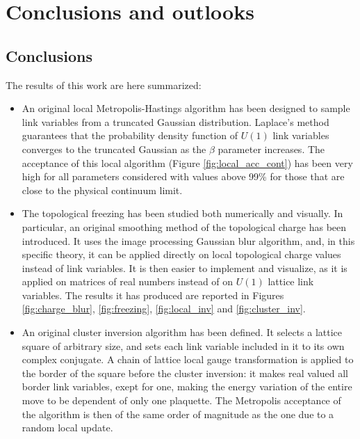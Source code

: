 \chapter{Conclusions and outlooks}\label{ch:conclusion}
\section{Conclusions}
The results of this work are here summarized:
\begin{itemize}
    \item
        An original local Metropolis-Hastings algorithm has been designed to sample link variables from a truncated Gaussian distribution.
        Laplace's method guarantees that the probability density function of $U(1)$ link variables converges to the truncated Gaussian
        as the $\beta$ parameter increases.
        The acceptance of this local algorithm (Figure \ref{fig:local_acc_cont}) has been very high for all parameters considered
        with values above 99\% for those that are close to the physical continuum limit.
    \item
        The topological freezing has been studied both numerically and visually.
        In particular, an original smoothing method of the topological charge has been introduced.
        It uses the image processing Gaussian blur algorithm, and, in this specific theory,
        it can be applied directly on local topological charge values instead of link variables.
        It is then easier to implement and visualize,
        as it is applied on matrices of real numbers instead of on $U(1)$ lattice link variables.
        The results it has produced are reported in Figures \ref{fig:charge_blur},
        \ref{fig:freezing}, \ref{fig:local_inv} and \ref{fig:cluster_inv}.
    \item
        An original cluster inversion algorithm has been defined.
        It selects a lattice square of arbitrary size, and sets each link variable included in it to its own complex conjugate.
        A chain of lattice local gauge transformation is applied to the border of the square before the cluster inversion:
        it makes real valued all border link variables, exept for one, making the energy variation of the entire move to be
        dependent of only one plaquette.
        The Metropolis acceptance of the algorithm is then of the same order of magnitude as the one due to a random local update.


\end{itemize}
